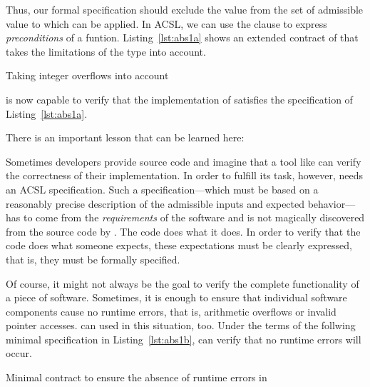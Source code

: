 Thus, our formal specification should exclude the value 
from the set of admissible value to which  can be applied.
In ACSL, we can use the  clause to express \emph{preconditions}
of a funtion.
Listing~\ref{lst:abs1a} shows an extended contract of 
that takes the limitations of the type  into account.

\begin{listing}[hbt]
\begin{minipage}{\textwidth}

\end{minipage}
\caption{\label{lst:abs1a} Taking integer overflows into account}
\end{listing}

\framacwp is now capable to verify that the implementation of
 satisfies the specification of Listing~\ref{lst:abs1a}.

There is an important lesson that can be learned here:
\begin{framed}
\label{lesson}
Sometimes developers provide source code and imagine that a tool
like \framacwp can verify the correctness of their implementation.
In order to fulfill its task, however, \framacwp needs an ACSL specification. 
Such a specification---which must be based on a reasonably precise description of the
admissible inputs and expected behavior---has to come from the \emph{requirements}
of the software and is not magically discovered from the source code by \framacwp.
The code does what it does. 
In order to verify that the code does what someone expects, these expectations
must be clearly expressed, that is, they must be formally specified.
\end{framed}

\clearpage 

Of course, it might not always be the goal to verify the complete functionality of a
piece of software.
Sometimes, it is enough to ensure that individual software components
cause no runtime errors, that is, arithmetic overflows or invalid pointer accesses.
\framacwp can used in this situation, too.
Under the terms of the follwing minimal specification in 
Listing~\ref{lst:abs1b}, \framacwp can verify that no runtime errors will occur.

\begin{listing}[hbt]
\begin{minipage}{\textwidth}

\end{minipage}
\caption{\label{lst:abs1b} Minimal contract to ensure the absence of runtime errors in }
\end{listing}

